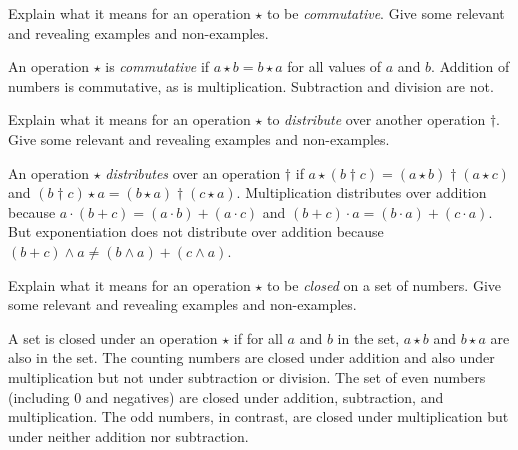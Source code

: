 \documentclass[nooutcomes]{ximera}
\begin{document}
\begin{problem}Explain what it means for an operation $\star$ to be
  \textit{commutative}. Give some relevant and revealing examples  and non-examples.
\begin{freeResponse}
\begin{hint}
An operation $\star$ is \textit{commutative} if $a\star b = b\star a$ for all values of $a$ and $b$.  Addition of numbers is commutative, as is multiplication.  Subtraction and division are not.  
\end{hint}
\end{freeResponse}
\end{problem} 

\begin{problem}Explain what it means for an operation $\star$ to \textit{distribute}
  over another operation $\dagger$. Give some relevant and revealing
  examples and non-examples.
\begin{freeResponse}
\begin{hint}
An operation $\star$ \textit{distributes} over an operation $\dagger$ if $a\star(b\dagger c) = (a\star b) \dagger (a\star c)$ and $(b\dagger c)\star a = (b\star a) \dagger (c\star a)$.  
Multiplication distributes over addition because $a\cdot(b+c) = (a\cdot b)+(a\cdot c)$ and $(b+c)\cdot a = (b\cdot a)+(c\cdot a)$.  
But exponentiation does not distribute over addition because $(b+c)\wedge a \ne (b\wedge a)+(c\wedge a)$.
\end{hint}
\end{freeResponse}
\end{problem} 

\begin{problem}Explain what it means for an operation $\star$ to be \textit{closed}
  on a set of numbers. Give some relevant and revealing
  examples and non-examples.
\begin{freeResponse}
\begin{hint}
A set is closed under an operation $\star$ if for all $a$ and $b$ in the set, $a\star b$ and $b\star a$ are also in the set.  The counting numbers are closed under addition and also under multiplication but not under subtraction or division.  The set of even numbers (including $0$ and negatives) are closed under addition, subtraction, and multiplication.  The odd numbers, in contrast, are closed under multiplication but under neither addition nor subtraction.
\end{hint}
\end{freeResponse}
\end{problem} 
\end{document}
